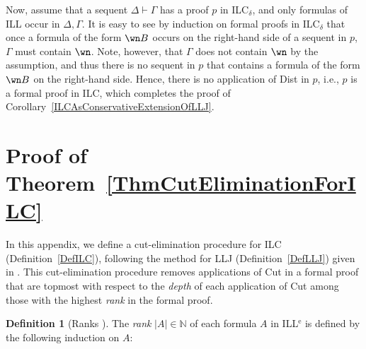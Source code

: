 \documentclass[a4paper]{article}
\theoremstyle{definition}
\newtheorem{definition}{Definition}[section]
\theoremstyle{theorem}
\theoremstyle{remark}
\begin{document}
Now, assume that a sequent $\Delta \vdash \Gamma$ has a proof $p$ in \textsf{ILC$_\delta$}, and only formulas of ILL occur in $\Delta, \Gamma$.
It is easy to see by induction on formal proofs in \textsf{ILC$_\delta$} that once a formula of the form $\wn B$ occurs on the right-hand side of a sequent in $p$, $\Gamma$ must contain $\wn$.
Note, however, that $\Gamma$ does not contain $\wn$ by the assumption, and thus there is no sequent in $p$ that contains a formula of the form $\wn B$ on the right-hand side.
Hence, there is no application of Dist in $p$, i.e., $p$ is a formal proof in \textsf{ILC}, which completes the proof of Corollary~\ref{ILCAsConservativeExtensionOfLLJ}.













\section{Proof of Theorem~\ref{ThmCutEliminationForILC}}
\label{CutElimination}
In this appendix, we define a cut-elimination procedure for \textsf{ILC} (Definition~\ref{DefILC}), following the method for \textsf{LLJ} (Definition~\ref{DefLLJ}) given in \cite{bierman1994intuitionistic}.
This cut-elimination procedure removes applications of Cut in a formal proof that are topmost with respect to the \emph{depth} of each application of Cut among those with the highest \emph{rank} in the formal proof.

\begin{definition}[Ranks \cite{bierman1994intuitionistic}]
\label{DefRanks}
The \emph{rank} $|A| \in \mathbb{N}$ of each formula $A$ in ILL$^{\text{e}}$ is defined by the following induction on $A$:
\end{definition}
\end{document}
